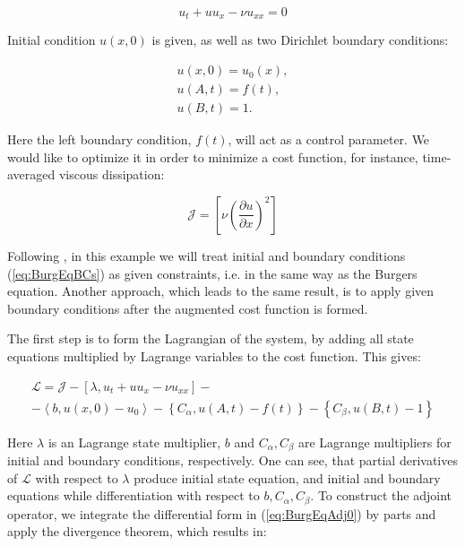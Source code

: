 \begin{equation}
\label{eq:BurgEq}
    u_t + u u_x - \nu u_{xx} = 0
\end{equation}

Initial condition $u(x,0)$ is given, as well as two Dirichlet boundary conditions:

\begin{subequations}
\label{eq:BurgEqBCs}
\begin{align}
    u(x,0) = u_0(x), \\
    u(A,t) = f(t), \\
    u(B,t) = 1.
\end{align}
\end{subequations}

Here the left boundary condition, $f(t)$, will act as a control parameter. We would like to optimize it in order to minimize a cost function, for instance, time-averaged viscous dissipation:

\begin{equation}
\mathcal{J} = \left[ \nu \left( \frac{\partial u}{\partial x} \right)^2 \right]
\end{equation}

Following \cite{CossuIntr}, in this example we will treat initial and boundary conditions (\ref{eq:BurgEqBCs}) as given constraints, i.e. in the same way as the Burgers equation. Another approach, which leads to the same result, is to apply given boundary conditions after the augmented cost function is formed.

The first step is to form the Lagrangian of the system, by adding all state equations multiplied by Lagrange variables to the cost function. This gives:

\begin{subequations}
\begin{align}
    \label{eq:BurgEqAdj0}
    \mathcal{L} = \mathcal{J} - \left[ \lambda, u_t + u u_x - \nu u_{xx} \right] -\\
    - \left< b, u(x,0) - u_0 \right> -  \left\{ C_{\alpha}, u(A,t) - f(t) \right\}  -  \left\{ C_{\beta}, u(B,t) - 1 \right\}
\end{align}
\end{subequations}

Here $\lambda$ is an Lagrange state multiplier, $b$ and $C_{\alpha}, C_{\beta}$ are Lagrange multipliers for initial and boundary conditions, respectively. One can see, that partial derivatives of $\mathcal{L}$ with respect to $\lambda$ produce initial state equation, and initial and boundary equations while differentiation with respect to $b, C_{\alpha}, C_{\beta}$. To construct the adjoint operator, we integrate the differential form in (\ref{eq:BurgEqAdj0}) by parts and apply the divergence theorem, which results in:

